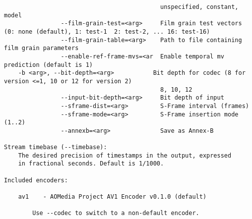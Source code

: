 \begin{appendices}
\begin{lstlisting}
                                            unspecified, constant, model
                --film-grain-test=<arg>     Film grain test vectors (0: none (default), 1: test-1  2: test-2, ... 16: test-16)
                --film-grain-table=<arg>    Path to file containing film grain parameters
                --enable-ref-frame-mvs=<ar  Enable temporal mv prediction (default is 1)
    -b <arg>, --bit-depth=<arg>           Bit depth for codec (8 for version <=1, 10 or 12 for version 2)
                                            8, 10, 12
                --input-bit-depth=<arg>     Bit depth of input
                --sframe-dist=<arg>         S-Frame interval (frames)
                --sframe-mode=<arg>         S-Frame insertion mode (1..2)
                --annexb=<arg>              Save as Annex-B

Stream timebase (--timebase):
    The desired precision of timestamps in the output, expressed
    in fractional seconds. Default is 1/1000.

Included encoders:

    av1    - AOMedia Project AV1 Encoder v0.1.0 (default)

        Use --codec to switch to a non-default encoder.
\end{lstlisting}
\end{appendices}